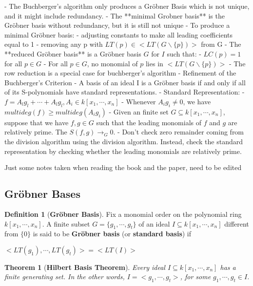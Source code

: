 \documentclass{article}
\newtheorem{theorem}{Theorem}[section]
\theoremstyle{definition}
\newtheorem{definition}{Definition}[section]
\theoremstyle{remark}
\theoremstyle{example}
\begin{document}
- The Buchberger's algorithm only produces a Gröbner Basis which is not unique, and it might include redundancy.
- The **minimal Grobner basis** is the Gröbner basis without redundancy, but it is still not unique
    - To produce a minimal Gröbner basis:
        - adjusting constants to make all leading coefficients equal to 1
        - removing any p with $LT(p) \in <LT(G\backslash\{p\})>$ from G
- The **reduced Gröbner basis** is a Gröbner basis  $G$ for $I$ such that:
    - $LC(p) = 1$ for all $p \in G$
    - For all $p \in G$, no monomial of $p$ lies in $<LT(G\backslash\{p\})>$
- The row reduction is a special case for buchberger's algorithm
- Refinement of the Buchberger's Criterion
    - A basis of an ideal I is a Gröbner basis if and only if all of its S-polynomials have standard representations.
        - Standard Representation:
            - $f = A_lg_l + \cdots + A_lg_l, A_i \in k[x_1, \cdots, x_n]$
            - Whenever $A_ig_i \neq 0$, we have $multideg(f) \geq multideg(A_ig_i)$
    - Given an finite set $G \subseteq k[x_1, \cdots, x_n]$, suppose that we have $f,g\in G$ such that the leading monomials of $f$ and $g$  are relatively prime. The $S(f,g) \rightarrow_{G} 0$.
    - Don't check zero remainder coming from the division algorithm using the division algorithm. Instead, check the standard representation by checking whether the leading monomials are relatively prime.
    

\textcolor{BrickRed}{Just some notes taken when reading the book and the paper, need to be edited}

\subsection{Gröbner Bases}

\begin{definition}[\textbf{Gröbner Basis}]\cite{cox_grobner_2015}\label{def:gb}
    Fix a monomial order on the polynomial ring $k[x_1, \cdots, x_n]$. A finite subset $G = \{g_1, \cdots, g_t\}$ of an ideal $I \subseteq k[x_1, \cdots, x_n]$ different from $\{0\}$ is said to be \textbf{Gröbner basis} (or \textbf{standard basis}) if
    \begin{center}
        $<LT(g_1), \cdots, LT(g_t)> = <LT(I)>$
    \end{center}
\end{definition}



\begin{theorem}[\textbf{Hilbert Basis Theorem}]\cite{cox_grobner_2015}\label{thm:hb_thm}
    Every ideal $I \subseteq k[x_1,\cdots,x_n]$ has a finite generating set. In the other words, $I = <g_1,\cdots,g_t>$, for some $g_1,\cdots,g_t \in I$.
\end{theorem}
\end{document}
